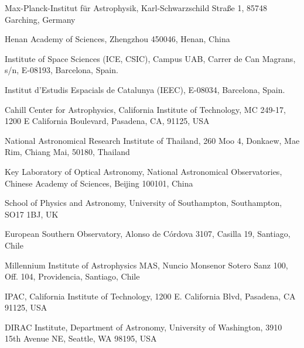 \documentclass{nature_plusfigure}
\begin{document}
\begin{small}
\begin{affiliations}
\item Max-Planck-Institut f{\"u}r Astrophysik, Karl-Schwarzschild Stra{\ss}e 1, 85748 Garching, Germany
\item Henan Academy of Sciences, Zhengzhou 450046, Henan, China
\item Institute of Space Sciences (ICE, CSIC), Campus UAB, Carrer de 
Can Magrans, s/n, E-08193, Barcelona, Spain.
\item Institut d’Estudis Espacials de Catalunya (IEEC), E-08034, Barcelona, Spain.
\item Cahill Center for Astrophysics, California Institute of Technology, MC 249-17, 1200 E California Boulevard, Pasadena, CA, 91125, USA
\item National Astronomical Research Institute of Thailand, 260 Moo 4, Donkaew, Mae Rim, Chiang Mai, 50180, Thailand
\item Key Laboratory of Optical Astronomy, National Astronomical Observatories, Chinese Academy of Sciences, Beĳing 100101, China
\item School of Physics and Astronomy, University of Southampton, Southampton, SO17 1BJ, UK
\item European Southern Observatory, Alonso de C\'ordova 3107, Casilla 19, Santiago, Chile
\item Millennium Institute of Astrophysics MAS, Nuncio Monsenor Sotero Sanz 100, Off. 104, Providencia, Santiago, Chile
\item IPAC, California Institute of Technology, 1200 E. California Blvd, Pasadena, CA 91125, USA
\item DIRAC Institute, Department of Astronomy, University of Washington, 3910 15th Avenue NE, Seattle, WA 98195, USA

\end{affiliations}
\end{small}
\end{document}
